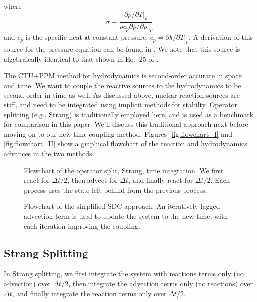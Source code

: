 \documentclass[times,preprint]{aastex63}
\begin{document}
where
\begin{equation}
\sigma \equiv \frac{\partial p/\partial T |_\rho}{\rho c_p \partial p/\partial \rho |_T}
\end{equation}
and $c_p$ is the specific heat at constant pressure, $c_p = \partial
h/\partial T |_p$.  A derivation of this source for the pressure
equation can be found in \cite{ABNZ:III}.  We note that this source is
algebraically identical to that shown in Eq.~25 of \cite{castro}.

The CTU+PPM method for hydrodynamics is second-order accurate in space
and time.  We want to couple the reactive sources to the hydrodynamics
to be second-order in time as well.  As discussed above, nuclear
reaction sources are stiff, and need to be integrated using implicit
methods for stabilty.  Operator splitting (e.g., Strang) is
traditionally employed here, and is used as a benchmark for comparison
in this paper.  We'll discuss this traditional approach next before moving
on to our new time-coupling method.  Figures~\ref{fig:flowchart_I} and \ref{fig:flowchart_II} show a graphical
flowchart of the reaction and hydrodynamics advances in the two methods.

\begin{figure}[t]
\caption{\label{fig:strang_flowchart} Flowchart of the operator split,
  Strang, time integration.  We first react for $\Delta t/2$, then
  advect for $\Delta t$, and finally react for $\Delta t/2$.  Each
  process uses the state left behind from the previous process.}
\end{figure}

\begin{figure}[t]
\caption{\label{fig:sdc_flowchart} Flowchart of the simplified-SDC
  approach.  An iteratively-lagged advection term is used to update
  the system to the new time, with each iteration improving the
  coupling.}
\end{figure}



\subsection{Strang Splitting}

In Strang splitting, we first integrate the system with reactions terms only (no advection)
over $\Delta t/2$, then integrate the advection terms only (no reactions) over $\Delta t$,
and finally integrate the reaction terms only over $\Delta t/2$.
\end{document}
